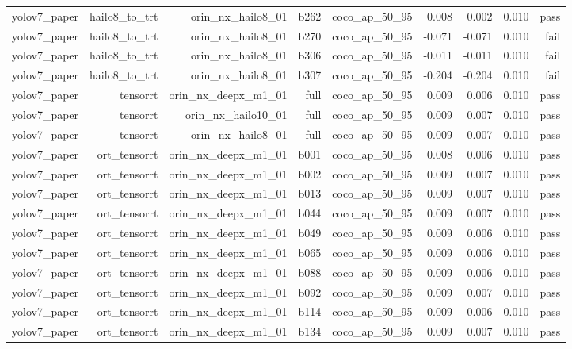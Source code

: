 \begin{table}[t]
\begin{tabular}{lrrrrrrrr}
yolov7\_paper & hailo8\_to\_trt & orin\_nx\_hailo8\_01 & b262 & coco\_ap\_50\_95 & 0.008 & 0.002 & 0.010 & pass \\
yolov7\_paper & hailo8\_to\_trt & orin\_nx\_hailo8\_01 & b270 & coco\_ap\_50\_95 & -0.071 & -0.071 & 0.010 & fail \\
yolov7\_paper & hailo8\_to\_trt & orin\_nx\_hailo8\_01 & b306 & coco\_ap\_50\_95 & -0.011 & -0.011 & 0.010 & fail \\
yolov7\_paper & hailo8\_to\_trt & orin\_nx\_hailo8\_01 & b307 & coco\_ap\_50\_95 & -0.204 & -0.204 & 0.010 & fail \\
yolov7\_paper & tensorrt & orin\_nx\_deepx\_m1\_01 & full & coco\_ap\_50\_95 & 0.009 & 0.006 & 0.010 & pass \\
yolov7\_paper & tensorrt & orin\_nx\_hailo10\_01 & full & coco\_ap\_50\_95 & 0.009 & 0.007 & 0.010 & pass \\
yolov7\_paper & tensorrt & orin\_nx\_hailo8\_01 & full & coco\_ap\_50\_95 & 0.009 & 0.007 & 0.010 & pass \\
yolov7\_paper & ort\_tensorrt & orin\_nx\_deepx\_m1\_01 & b001 & coco\_ap\_50\_95 & 0.008 & 0.006 & 0.010 & pass \\
yolov7\_paper & ort\_tensorrt & orin\_nx\_deepx\_m1\_01 & b002 & coco\_ap\_50\_95 & 0.009 & 0.007 & 0.010 & pass \\
yolov7\_paper & ort\_tensorrt & orin\_nx\_deepx\_m1\_01 & b013 & coco\_ap\_50\_95 & 0.009 & 0.007 & 0.010 & pass \\
yolov7\_paper & ort\_tensorrt & orin\_nx\_deepx\_m1\_01 & b044 & coco\_ap\_50\_95 & 0.009 & 0.007 & 0.010 & pass \\
yolov7\_paper & ort\_tensorrt & orin\_nx\_deepx\_m1\_01 & b049 & coco\_ap\_50\_95 & 0.009 & 0.006 & 0.010 & pass \\
yolov7\_paper & ort\_tensorrt & orin\_nx\_deepx\_m1\_01 & b065 & coco\_ap\_50\_95 & 0.009 & 0.006 & 0.010 & pass \\
yolov7\_paper & ort\_tensorrt & orin\_nx\_deepx\_m1\_01 & b088 & coco\_ap\_50\_95 & 0.009 & 0.006 & 0.010 & pass \\
yolov7\_paper & ort\_tensorrt & orin\_nx\_deepx\_m1\_01 & b092 & coco\_ap\_50\_95 & 0.009 & 0.007 & 0.010 & pass \\
yolov7\_paper & ort\_tensorrt & orin\_nx\_deepx\_m1\_01 & b114 & coco\_ap\_50\_95 & 0.009 & 0.006 & 0.010 & pass \\
yolov7\_paper & ort\_tensorrt & orin\_nx\_deepx\_m1\_01 & b134 & coco\_ap\_50\_95 & 0.009 & 0.007 & 0.010 & pass \\

\end{tabular}
\end{table}

